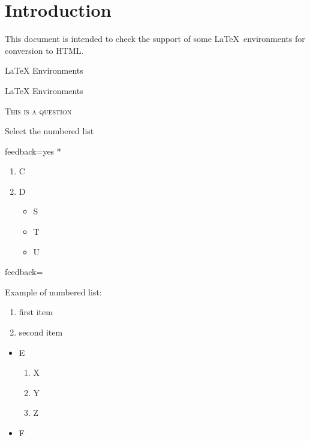 \documentclass{article}
\begin{document}
\section*{Introduction}

This document is intended to check the support of some \LaTeX\ environments for 
conversion to HTML.

\begin{quiz}[points=1]{LaTeX Environments}
\begin{multi}{LaTeX Environments}
\begin{center}
\textsc{This is a question}
\end{center}
Select the numbered list
\item[feedback={yes}]* \begin{enumerate}
         \item C
         \item D
         \begin{itemize}
           \item S
           \item T
           \item U
          \end{itemize}  
       \end{enumerate}
\item[feedback={Example of numbered list:\\\begin{enumerate}
\item first item
\item second item
\end{enumerate}
}] \begin{itemize}
         \item E
         \begin{enumerate}
         \item X
         \item Y
         \item Z
         \end{enumerate}
         \item F
      \end{itemize}
\end{multi}
\end{quiz}
\end{document}
